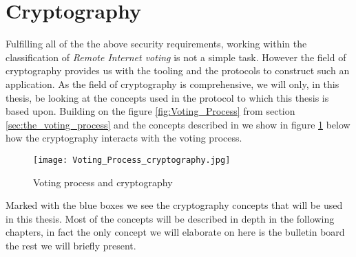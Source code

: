 \section{Cryptography}
Fulfilling all of the the above security requirements, working within the classification of \textit{Remote Internet voting} is not a simple task. However the field of cryptography provides us with the tooling and the protocols to construct such an application. As the field of cryptography is comprehensive, we will only, in this thesis, be looking at the concepts used in the protocol to which this thesis is based upon. Building on the figure \ref{fig:Voting_Process} from section \ref{sec:the_voting_process} and the concepts described in \cite{Cet09} we show in figure \ref{fig:Voting_Process_cryptography} below how the cryptography interacts with the voting process. 

\begin{figure}[H]
    \centering
    \texttt{[image: Voting\_Process\_cryptography.jpg]}
    \caption{Voting process and cryptography}
    \label{fig:Voting_Process_cryptography}
\end{figure}

\noindent
Marked with the blue boxes we see the cryptography concepts that will be used in this thesis. Most of the concepts will be described in depth in the following chapters, in fact the only concept we will elaborate on here is the bulletin board the rest we will briefly present.

